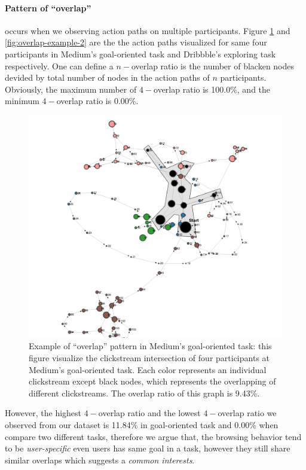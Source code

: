 \paragraph{Pattern of ``overlap''}
occurs when we observing action paths on multiple participants. Figure \ref{fig:overlap-example-1}
and \ref{fig:overlap-example-2} are the the action paths visualized for same four participants
in Medium's goal-oriented task and Dribbble's exploring task respectively.
One can define a $n-$overlap ratio is the number of blacken nodes devided by total number of nodes
in the action paths of $n$ participants. Obviously, the maximum number of $4-$overlap ratio
is 100.0\%, and the minimum $4-$overlap ratio is 0.00\%.

\begin{figure}[H]
    \centering
    \includegraphics[width=1\textwidth]{figures/overlap1}
    \caption{Example of ``overlap'' pattern in Medium's goal-oriented task: 
    this figure visualize the clickstream intersection 
    of four participants at Medium's goal-oriented task. Each color represents an
    individual clickstream except black nodes, which represents the overlapping of different clickstreams.
    The overlap ratio of this graph is 9.43\%.}
    \label{fig:overlap-example-1}
\end{figure}

However, the highest $4-$overlap ratio and the lowest $4-$overlap ratio we observed from our
dataset is 11.84\% in goal-oriented task and 0.00\% when compare two different tasks, 
therefore we argue that, the browsing behavior tend to be \emph{user-specific} even users has same
goal in a task, however they still share similar overlaps which suggests a \emph{common interests}.

